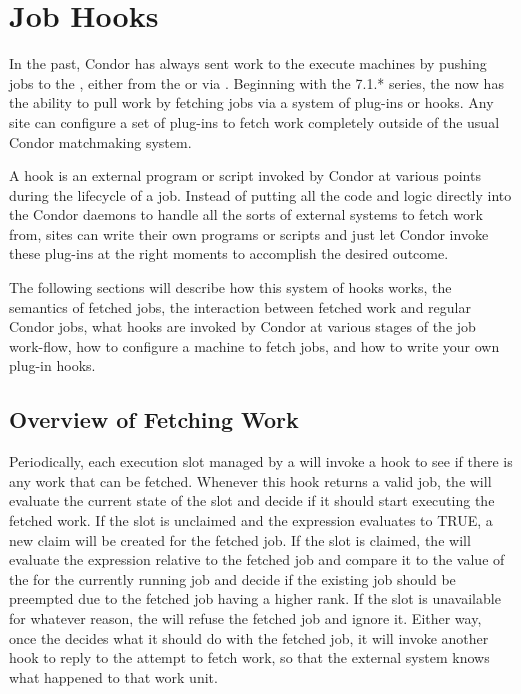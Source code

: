\section{\label{sec:job-hooks}Job Hooks}

In the past, Condor has always sent work to the execute machines by
pushing jobs to the , either from the 
or via .
Beginning with the 7.1.* series, the  now has the
ability to pull work by fetching jobs via a system of plug-ins or
hooks.
Any site can configure a set of plug-ins to fetch work completely
outside of the usual Condor matchmaking system.

A hook is an external program or script invoked by Condor at various
points during the lifecycle of a job.
Instead of putting all the code and logic directly into the Condor
daemons to handle all the sorts of external systems to fetch work
from, sites can write their own programs or scripts and just let
Condor invoke these plug-ins at the right moments to accomplish the
desired outcome.

The following sections will describe how this system of hooks works,
the semantics of fetched jobs, the interaction between fetched work
and regular Condor jobs, what hooks are invoked by Condor at various
stages of the job work-flow, how to configure a machine to fetch jobs,
and how to write your own plug-in hooks.


\subsection{\label{sec:job-hooks-overview}
Overview of Fetching Work}

Periodically, each execution slot managed by a  will
invoke a hook to see if there is any work that can be fetched.
Whenever this hook returns a valid job, the  will
evaluate the current state of the slot and decide if it should start
executing the fetched work.
If the slot is unclaimed and the  expression evaluates to
TRUE, a new claim will be created for the fetched job.
If the slot is claimed, the  will evaluate the
 expression relative to the fetched job and compare it to
the value of the  for the currently running job and decide
if the existing job should be preempted due to the fetched job having
a higher rank.
If the slot is unavailable for whatever reason, the 
will refuse the fetched job and ignore it.
Either way, once the  decides what it should do with
the fetched job, it will invoke another hook to reply to the attempt
to fetch work, so that the external system knows what happened to that
work unit.

